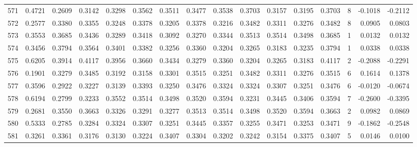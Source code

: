 \begin{tabular}{lrrrrrrrrrrrrrrr}
571 &      0.4721 &  0.2609 &  0.3142 &  0.3298 &  0.3562 &  0.3511 &  0.3477 &  0.3538 &  0.3703 &  0.3157 &   0.3195 &     0.3703 &      8 &                   -0.1018 &                    -0.2112 \\
572 &      0.2577 &  0.3380 &  0.3355 &  0.3248 &  0.3378 &  0.3205 &  0.3378 &  0.3216 &  0.3482 &  0.3311 &   0.3276 &     0.3482 &      8 &                    0.0905 &                     0.0803 \\
573 &      0.3553 &  0.3685 &  0.3436 &  0.3289 &  0.3418 &  0.3092 &  0.3270 &  0.3344 &  0.3513 &  0.3514 &   0.3498 &     0.3685 &      1 &                    0.0132 &                     0.0132 \\
574 &      0.3456 &  0.3794 &  0.3564 &  0.3401 &  0.3382 &  0.3256 &  0.3360 &  0.3204 &  0.3265 &  0.3183 &   0.3235 &     0.3794 &      1 &                    0.0338 &                     0.0338 \\
575 &      0.6205 &  0.3914 &  0.4117 &  0.3956 &  0.3660 &  0.3434 &  0.3279 &  0.3360 &  0.3204 &  0.3265 &   0.3183 &     0.4117 &      2 &                   -0.2088 &                    -0.2291 \\
576 &      0.1901 &  0.3279 &  0.3485 &  0.3192 &  0.3158 &  0.3301 &  0.3515 &  0.3251 &  0.3482 &  0.3311 &   0.3276 &     0.3515 &      6 &                    0.1614 &                     0.1378 \\
577 &      0.3596 &  0.2922 &  0.3227 &  0.3139 &  0.3393 &  0.3250 &  0.3476 &  0.3324 &  0.3324 &  0.3307 &   0.3251 &     0.3476 &      6 &                   -0.0120 &                    -0.0674 \\
578 &      0.6194 &  0.2799 &  0.3233 &  0.3552 &  0.3514 &  0.3498 &  0.3520 &  0.3594 &  0.3231 &  0.3445 &   0.3406 &     0.3594 &      7 &                   -0.2600 &                    -0.3395 \\
579 &      0.2681 &  0.3550 &  0.3663 &  0.3326 &  0.3291 &  0.3277 &  0.3513 &  0.3514 &  0.3498 &  0.3520 &   0.3594 &     0.3663 &      2 &                    0.0982 &                     0.0869 \\
580 &      0.5333 &  0.2785 &  0.3284 &  0.3324 &  0.3307 &  0.3251 &  0.3445 &  0.3357 &  0.3255 &  0.3471 &   0.3253 &     0.3471 &      9 &                   -0.1862 &                    -0.2548 \\
581 &      0.3261 &  0.3361 &  0.3176 &  0.3130 &  0.3224 &  0.3407 &  0.3304 &  0.3202 &  0.3242 &  0.3154 &   0.3375 &     0.3407 &      5 &                    0.0146 &                     0.0100 \\

\end{tabular}
